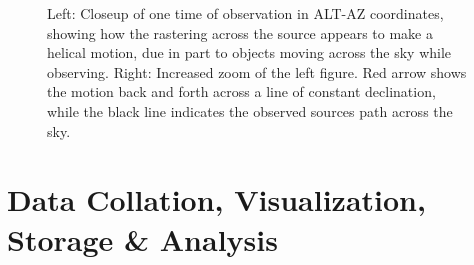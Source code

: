 \documentclass[manuscript]{aastex}
\begin{document}
\begin{figure}[H]%
    \centering
    \qquad
    \singlespace
    \caption[TIME Scan Strategy 2]{Left: Closeup of one time of observation in ALT-AZ coordinates, showing how the rastering across the source appears to make a helical motion, due in part to objects moving across the sky while observing. Right: Increased zoom of the left figure. Red arrow shows the motion back and forth across a line of constant declination, while the black line indicates the observed sources path across the sky.}%
    \label{fig:time2cd}%
\end{figure}

\newpage
\section{Data Collation, Visualization, Storage \& Analysis}
\end{document}
